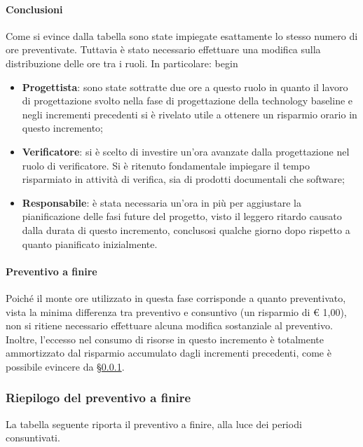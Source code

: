 \paragraph{Conclusioni}
Come si evince dalla tabella sono state impiegate esattamente lo stesso numero di ore preventivate. Tuttavia è stato necessario effettuare una modifica sulla distribuzione delle ore tra i ruoli. In particolare:
begin\begin{itemize}
	\item \textbf{Progettista}: sono state sottratte due ore a questo ruolo in quanto il lavoro di progettazione svolto nella fase di progettazione della technology baseline e negli incrementi precedenti si è rivelato utile a ottenere un risparmio orario in questo incremento;
	\item \textbf{Verificatore}: si è scelto di investire un'ora avanzate dalla progettazione nel ruolo di verificatore. Si è ritenuto fondamentale impiegare il tempo risparmiato in attività di verifica, sia di prodotti documentali che software;
	\item \textbf{Responsabile}: è stata necessaria un'ora in più per aggiustare la pianificazione delle fasi future del progetto, visto il leggero ritardo causato dalla durata di questo incremento, conclusosi qualche giorno dopo rispetto a quanto pianificato inizialmente.
\end{itemize} 

\paragraph{Preventivo a finire}
Poiché il monte ore utilizzato in questa fase corrisponde a quanto preventivato, vista la minima differenza tra preventivo e consuntivo (un risparmio di € 1,00), non si ritiene necessario effettuare alcuna modifica sostanziale al preventivo. Inoltre, l'eccesso nel consumo di risorse in questo incremento è totalmente ammortizzato dal risparmio accumulato dagli incrementi precedenti, come è possibile evincere da \S\ref{riepilogoPAF}.

\subsubsection{Riepilogo del preventivo a finire}\label{riepilogoPAF}

La tabella seguente riporta il preventivo a finire, alla luce dei periodi consuntivati.

